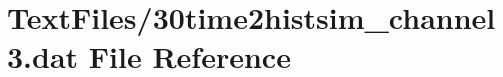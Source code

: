 \hypertarget{30time2histsim__channel3_8dat}{}\section{Text\+Files/30time2histsim\+\_\+channel3.dat File Reference}
\label{30time2histsim__channel3_8dat}
